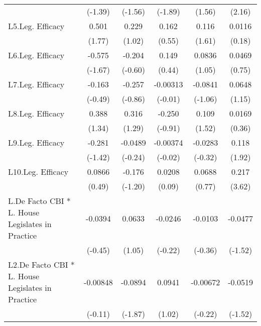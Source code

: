 {\begin{longtable}{l*{5}{c}}
                &  (-1.39)         &  (-1.56)         &  (-1.89)         &   (1.56)         &   (2.16)         \\
[1em]
L5.Leg. Efficacy&    0.501         &    0.229         &    0.162         &    0.116         &   0.0116         \\
                &   (1.77)         &   (1.02)         &   (0.55)         &   (1.61)         &   (0.18)         \\
[1em]
L6.Leg. Efficacy&   -0.575         &   -0.204         &    0.149         &   0.0836         &   0.0469         \\
                &  (-1.67)         &  (-0.60)         &   (0.44)         &   (1.05)         &   (0.75)         \\
[1em]
L7.Leg. Efficacy&   -0.163         &   -0.257         & -0.00313         &  -0.0841         &   0.0648         \\
                &  (-0.49)         &  (-0.86)         &  (-0.01)         &  (-1.06)         &   (1.15)         \\
[1em]
L8.Leg. Efficacy&    0.388         &    0.316         &   -0.250         &    0.109         &   0.0169         \\
                &   (1.34)         &   (1.29)         &  (-0.91)         &   (1.52)         &   (0.36)         \\
[1em]
L9.Leg. Efficacy&   -0.281         &  -0.0489         & -0.00374         &  -0.0283         &    0.118         \\
                &  (-1.42)         &  (-0.24)         &  (-0.02)         &  (-0.32)         &   (1.92)         \\
[1em]
L10.Leg. Efficacy&   0.0866         &   -0.176         &   0.0208         &   0.0688         &    0.217\sym{***}\\
                &   (0.49)         &  (-1.20)         &   (0.09)         &   (0.77)         &   (3.62)         \\
[1em]
L.De Facto CBI * L. House Legislates in Practice&  -0.0394         &   0.0633         &  -0.0246         &  -0.0103         &  -0.0477         \\
                &  (-0.45)         &   (1.05)         &  (-0.22)         &  (-0.36)         &  (-1.52)         \\
[1em]
L2.De Facto CBI * L. House Legislates in Practice& -0.00848         &  -0.0894         &   0.0941         & -0.00672         &  -0.0519         \\
                &  (-0.11)         &  (-1.87)         &   (1.02)         &  (-0.22)         &  (-1.52)         \\

\end{longtable}}
